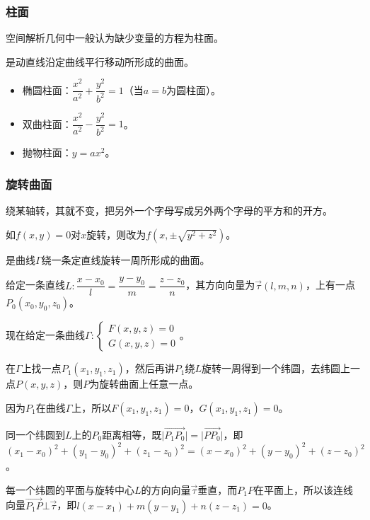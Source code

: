 \documentclass[UTF8, 12pt]{ctexart}
\begin{document}
        \subsubsection{柱面}

        空间解析几何中一般认为缺少变量的方程为柱面。

        是动直线沿定曲线平行移动所形成的曲面。

        \begin{itemize}
            \item 椭圆柱面：$\dfrac{x^2}{a^2}+\dfrac{y^2}{b^2}=1$（当$a=b$为圆柱面）。
            \item 双曲柱面：$\dfrac{x^2}{a^2}-\dfrac{y^2}{b^2}=1$。
            \item 抛物柱面：$y=ax^2$。
        \end{itemize}

        \subsubsection{旋转曲面}

        绕某轴转，其就不变，把另外一个字母写成另外两个字母的平方和的开方。

        如$f(x,y)=0$对$x$旋转，则改为$f(x,\pm\sqrt{y^2+z^2})$。

        是曲线$\varGamma$绕一条定直线旋转一周所形成的曲面。

        给定一条直线$L:\dfrac{x-x_0}{l}=\dfrac{y-y_0}{m}=\dfrac{z-z_0}{n}$，其方向向量为$\vec{\tau}(l,m,n)$，上有一点$P_0(x_0,y_0,z_0)$。

        现在给定一条曲线$\varGamma:\left\{\begin{array}{l}
                                              F(x,y,z)=0 \\
                                              G(x,y,z)=0
        \end{array}\right.$。

        在$\varGamma$上找一点$P_1(x_1,y_1,z_1)$，然后再讲$P_1$绕$L$旋转一周得到一个纬圆，去纬圆上一点$P(x,y,z)$，则$P$为旋转曲面上任意一点。

        因为$P_1$在曲线$\varGamma$上，所以$F(x_1,y_1,z_1)=0$，$G(x_1,y_1,z_1)=0$。

        同一个纬圆到$L$上的$P_0$距离相等，既$\vert\overrightarrow{P_1P_0}\vert=\vert\overrightarrow{PP_0}\vert$，即$(x_1-x_0)^2+(y_1-y_0)^2+(z_1-z_0)^2=(x-x_0)^2+(y-y_0)^2+(z-z_0)^2$。

        每一个纬圆的平面与旋转中心$L$的方向向量$\vec{\tau}$垂直，而$P_1P$在平面上，所以该连线向量$\overrightarrow{P_1P}\bot\vec{\tau}$，即$l(x-x_1)+m(y-y_1)+n(z-z_1)=0$。
\end{document}
